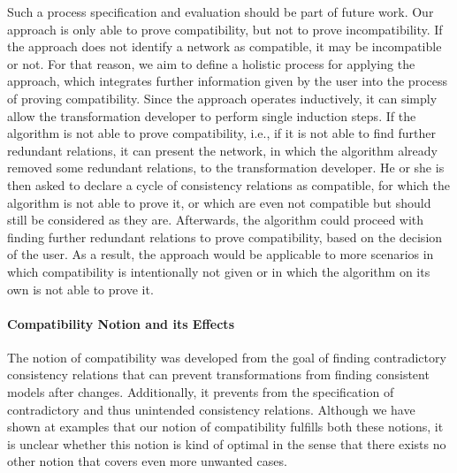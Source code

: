 Such a process specification and evaluation should be part of future work.
Our approach is only able to prove compatibility, but not to prove incompatibility. If the approach does not identify a network as compatible, it may be incompatible or not.
For that reason, we aim to define a holistic process for applying the approach, which integrates further information given by the user into the process of proving compatibility.
Since the approach operates inductively, it can simply allow the transformation developer to perform single induction steps.
If the algorithm is not able to prove compatibility, i.e., if it is not able to find further redundant relations, it can present the network, in which the algorithm already removed some redundant relations, to the transformation developer.
He or she is then asked to declare a cycle of consistency relations as compatible, for which the algorithm is not able to prove it, or which are even not compatible but should still be considered as they are.
Afterwards, the algorithm could proceed with finding further redundant relations to prove compatibility, based on the decision of the user.
As a result, the approach would be applicable to more scenarios in which compatibility is intentionally not given or in which the algorithm on its own is not able to prove it.



\paragraph{Compatibility Notion and its Effects}
The notion of compatibility was developed from the goal of finding contradictory consistency relations that can prevent transformations from finding consistent models after changes.
Additionally, it prevents from the specification of contradictory and thus unintended consistency relations.
Although we have shown at examples that our notion of compatibility fulfills both these notions, it is unclear whether this notion is kind of optimal in the sense that there exists no other notion that covers even more unwanted cases.


